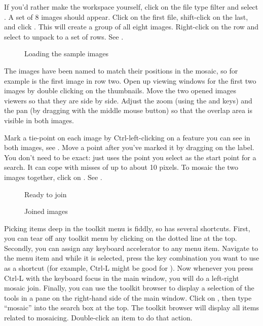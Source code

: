 If you'd rather make the workspace yourself, click on the file type filter and
select . A set of 8 images should appear.  Click on the first
file, shift-click on the last, and click . This will create a group
of all eight images. Right-click on the row and select  to unpack
to a set of rows.  See .

\begin{figure}
\caption{Loading the sample images}
\end{figure}

The images have been named to match their positions in the mosaic, so for
example  is the first image in row two.  Open up viewing windows
for the first two images by double clicking on the thumbnails.
Move the two opened images viewers so that they are side by side. Adjust
the zoom (using the  and  keys) and the pan (by dragging with the
middle mouse button) so that the overlap
area is visible in both images.

Mark a tie-point on each image by Ctrl-left-clicking on a feature you can see
in both images, see . Move a point after you've marked it
by dragging on the label. You don't need to be exact: \nip{} just uses the
point you select as the start point for a search. It can cope with
misses of up to about 10 pixels. To mosaic the two images together, click
on . 
See .

\begin{figure}
\caption{Ready to join}
\end{figure}

\begin{figure}
\caption{Joined images}
\end{figure}

Picking items deep in the toolkit menu is fiddly, so \nip{} has several
shortcuts.  First, you can tear off any toolkit menu by clicking on the dotted
line at the top. Secondly,
you can assign any keyboard accelerator to any menu item. Navigate to the
menu item and while it is selected, press the key combination you want to use
as a shortcut (for example, Ctrl-L might be good for ). Now whenever you press Ctrl-L with the keyboard
focus in the main window, you will do a left-right mosaic join. Finally, you
can use the toolkit browser to display a selection of the tools in a pane on
the right-hand side of the main window. Click on , then type ``mosaic'' into the search box at the top. The toolkit
browser will display all items related to mosaicing. Double-click an item to
do that action. 

